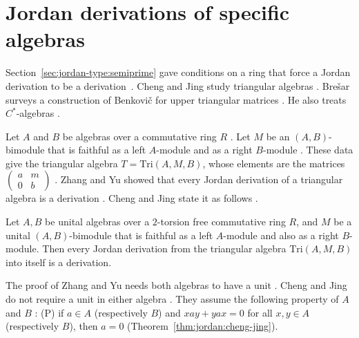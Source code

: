 \section{Jordan derivations of specific algebras}\label{sec:jordan-type:jordan-on-algebras}

Section~\ref{sec:jordan-type:semiprime} gave conditions on a ring that force a
Jordan derivation to be a derivation~\cite[Section~5, p.~421]{Bresar2005}. Cheng and Jing study triangular algebras
\cite[p.~1]{ChengJing2007}. Brešar surveys a construction of Benkovič for
upper triangular matrices \cite[\S4.1, p.~418]{Bresar2005}. He also treats
$C^{*}$-algebras \cite[Section~5, p.~421]{Bresar2005}.

Let $A$ and $B$ be algebras over a commutative ring $R$ \cite[p.~2]{ChengJing2007}. Let $M$ be an
$(A,B)$-bimodule that is faithful as a left $A$-module and as a right $B$-module
\cite[p.~2]{ChengJing2007}. These data give the triangular algebra $T=\mathrm{Tri}(A,M,B)$, whose elements are the
matrices $\begin{pmatrix}a&m\\0&b\end{pmatrix}$ \cite[p.~2]{ChengJing2007}.
Zhang and Yu showed that every Jordan derivation of a triangular algebra is a derivation
\cite[p.~1]{ChengJing2007}. Cheng and Jing state it as follows \cite[p.~1]{ChengJing2007}.

\begin{theorem}\label{thm:jordan:zhang-yu}
Let $A,B$ be unital algebras over a $2$-torsion free commutative ring $R$, and $M$ be a unital
$(A,B)$-bimodule that is faithful as a left $A$-module and also as a right $B$-module. Then every
Jordan derivation from the triangular algebra $\mathrm{Tri}(A,M,B)$ into itself is a derivation.
\end{theorem}

The proof of Zhang and Yu needs both algebras to have a unit
\cite[p.~1]{ChengJing2007}. Cheng and Jing do not require a unit in either
algebra \cite[p.~1]{ChengJing2007}. They assume the following property of $A$
and $B$ \cite[Section~2, p.~2]{ChengJing2007}: (P) if $a\in A$ (respectively
$B$) and $xay+yax=0$ for all $x,y\in A$ (respectively $B$), then $a=0$
(Theorem~\ref{thm:jordan:cheng-jing}).

